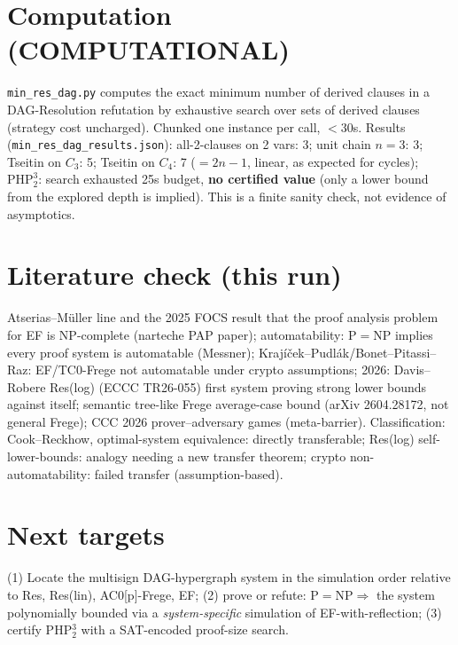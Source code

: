\documentclass{article}
\begin{document}
\section{Computation (COMPUTATIONAL)}
\texttt{min\_res\_dag.py} computes the exact minimum number of derived clauses in a DAG-Resolution refutation by exhaustive search over sets of derived clauses (strategy cost uncharged). Chunked one instance per call, $<30$s. Results (\texttt{min\_res\_dag\_results.json}): all-2-clauses on 2 vars: 3; unit chain $n{=}3$: 3; Tseitin on $C_3$: 5; Tseitin on $C_4$: 7 ($=2n-1$, linear, as expected for cycles); $\mathrm{PHP}^3_2$: search exhausted 25s budget, \textbf{no certified value} (only a lower bound from the explored depth is implied). This is a finite sanity check, not evidence of asymptotics.

\section{Literature check (this run)}
Atserias--M\"uller line and the 2025 FOCS result that the proof analysis problem for EF is NP-complete (narteche PAP paper); automatability: $\mathrm P=\mathrm{NP}$ implies every proof system is automatable (Messner); Krajíček--Pudlák/Bonet--Pitassi--Raz: EF/TC0-Frege not automatable under crypto assumptions; 2026: Davis--Robere Res(log) (ECCC TR26-055) first system proving strong lower bounds against itself; semantic tree-like Frege average-case bound (arXiv 2604.28172, not general Frege); CCC 2026 prover--adversary games (meta-barrier). Classification: Cook--Reckhow, optimal-system equivalence: directly transferable; Res(log) self-lower-bounds: analogy needing a new transfer theorem; crypto non-automatability: failed transfer (assumption-based).

\section{Next targets}
(1) Locate the multisign DAG-hypergraph system in the simulation order relative to Res, Res(lin), AC0[p]-Frege, EF; (2) prove or refute: $\mathrm P=\mathrm{NP}\Rightarrow$ the system polynomially bounded via a \emph{system-specific} simulation of EF-with-reflection; (3) certify PHP$^3_2$ with a SAT-encoded proof-size search.
\end{document}
